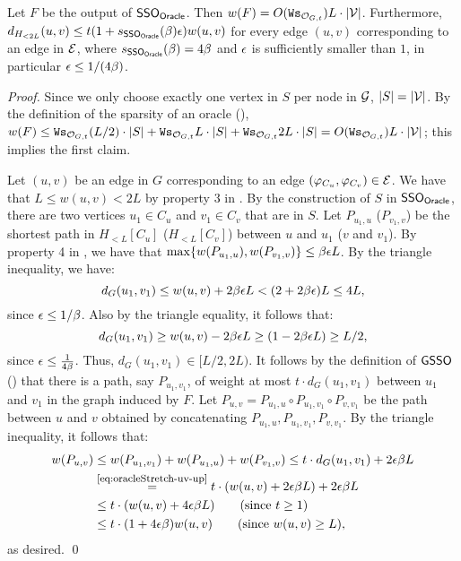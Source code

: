 \begin{lemma}\label{lm:App-Oracle} Let $F$ be the output of \hypertarget{SPHOracle}{$\mathsf{SSO}_{\mathsf{Oracle}}$}. Then $w(F) = O(\mathtt{Ws}_{\mathcal{O}_{G,t}})L\cdot |\mathcal{V}|$. Furthermore,  $d_{H_{<2L}}(u,v) \leq t(1+ s_{\mathsf{SSO}_{\mathsf{Oracle}}}(\beta)\epsilon)w(u,v)$ for every edge $(u,v)$ corresponding to an edge in $\mathcal{E}$, where  $s_{\mathsf{SSO}_{\mathsf{Oracle}}}(\beta) = 4\beta$ and $\epsilon$ is sufficiently smaller than $1$, in particular $\epsilon \leq 1/(4\beta)$. 
\end{lemma}
\begin{proof} Since we only choose exactly one vertex in $S$ per node in $\mathcal{G}$, $|S| = |\mathcal{V}|$. By the definition of the sparsity of an oracle (), $w(F) \leq \mathtt{Ws}_{\mathcal{O}_{G,t}} (L/2)\cdot |S| + \mathtt{Ws}_{\mathcal{O}_{G,t}} L\cdot |S| + \mathtt{Ws}_{\mathcal{O}_{G,t}} 2L\cdot |S| = O(\mathtt{Ws}_{\mathcal{O}_{G,t}})L\cdot |\mathcal{V}|$; this implies the first claim. 
	
		Let $(u,v)$ be an edge in $G$ corresponding to an edge $(\varphi_{C_u}, \varphi_{C_v}) \in \mathcal{E}$. We have that $L \leq w(u,v)< 2L$ by property 3 in . By the construction of $S$ in \hyperlink{SPHOracle}{$\mathsf{SSO}_{\mathsf{Oracle}}$}, there are two vertices $u_1 \in C_u$ and $v_1 \in C_v$ that are in $S$. Let $P_{u_1,u}$ ($P_{v_1,v}$) be the shortest path in $H_{<L}[C_u]$ ($H_{<L}[C_v]$) between $u$ and $u_1$ ($v$ and $v_1$). By property 4 in , we have that $\max\{w(P_{u_1,u}), w(P_{v_1,v})\} \leq \beta \epsilon L$. By the triangle inequality, we have:
	\begin{equation}\label{eq:oracleStretch-uv-up}
		d_G(u_1,v_1)\leq w(u,v) + 2\beta\epsilon L < (2+2\beta\epsilon) L \leq 4L,
	\end{equation}
	since $\epsilon \leq 1/\beta$. Also by the triangle equality, it follows that:
	\begin{equation}\label{eq:oracleStretch-uv-low}
		d_G(u_1,v_1) \geq w(u,v) - 2\beta\epsilon L\geq (1 - 2\beta\epsilon L) \geq L/2,
	\end{equation}
	since $\epsilon \leq \frac{1}{4\beta}$. Thus, $d_G(u_1,v_1) \in [L/2, 2L)$. It follows by the definition of $\mathsf{GSSO}$ () that there is a path, say $P_{u_1,v_1}$, of weight at most $t\cdot d_G(u_1,v_1)$  between $u_1$ and $v_1$ in the graph induced by $F$. Let $P_{u,v} = P_{u_1,u}\circ P_{u_1,v_1}\circ P_{v,v_1}$ be the path between $u$ and $v$  obtained by concatenating $P_{u_1,u}, P_{u_1,v_1}, P_{v,v_1}$. By the triangle inequality, it follows that:
	\begin{equation}
		\begin{split}
			w(P_{u,v}) &\leq w(P_{u_1,v_1}) + w(P_{u_1,u}) + w(P_{v_1,v}) \leq t\cdot d_G(u_1,v_1) + 2\eps \beta L \\
			&\stackrel{\mbox{\footnotesize{\cref{eq:oracleStretch-uv-up}}}}{=} t\cdot ( w(u,v) + 2\eps\beta  L) + 2\eps\beta L \\
			&\leq t\cdot (w(u,v) + 4\eps\beta L) \qquad \mbox{(since $t\geq 1$)}\\
			&\leq t\cdot (1 + 4\eps  \beta)w(u,v) \qquad \mbox{(since $w(u,v)\geq L$)},
		\end{split}
	\end{equation}
	as desired. \qed 
\end{proof}

